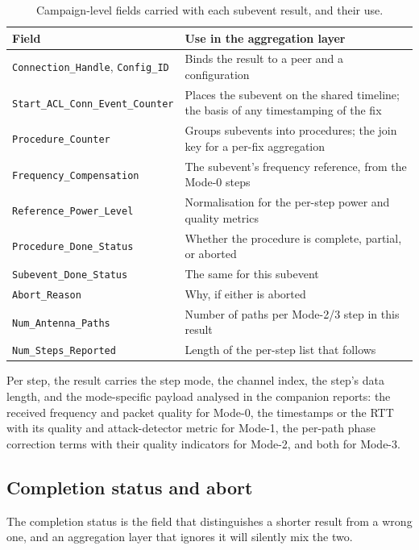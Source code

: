 \documentclass[11pt,a4paper]{article}
\newcommand{\code}[1]{\texttt{\small #1}}
\begin{document}
\begin{table}[h]
\caption{Campaign-level fields carried with each subevent result, and their use.}
\label{tab:results}
\centering\small
\begin{tabular}{@{}L{42mm}L{88mm}@{}}
\toprule
Field & Use in the aggregation layer \\
\midrule
\code{Connection\_Handle}, \code{Config\_ID} & Binds the result to a peer and a configuration \\
\code{Start\_ACL\_Conn\_}\newline\code{Event\_Counter} & Places the subevent on the shared timeline; the basis of
   any timestamping of the fix \\
\code{Procedure\_Counter} & Groups subevents into procedures; the join key for a per-fix aggregation \\
\code{Frequency\_Compensation} & The subevent's frequency reference, from the Mode-0 steps \\
\code{Reference\_Power\_Level} & Normalisation for the per-step power and quality metrics \\
\code{Procedure\_Done\_Status} & Whether the procedure is complete, partial, or aborted \\
\code{Subevent\_Done\_Status} & The same for this subevent \\
\code{Abort\_Reason} & Why, if either is aborted \\
\code{Num\_Antenna\_Paths} & Number of paths per Mode-2/3 step in this result \\
\code{Num\_Steps\_Reported} & Length of the per-step list that follows \\
\bottomrule
\end{tabular}
\end{table}

Per step, the result carries the step mode, the channel index, the step's data length, and the
mode-specific payload analysed in the companion reports: the received frequency and packet quality
for Mode-0, the timestamps or the RTT with its quality and attack-detector metric for Mode-1, the
per-path phase correction terms with their quality indicators for Mode-2, and both for Mode-3.

\subsection{Completion status and abort}
\label{sec:results-abort}

The completion status is the field that distinguishes a shorter result from a wrong one, and an
aggregation layer that ignores it will silently mix the two.
\end{document}
